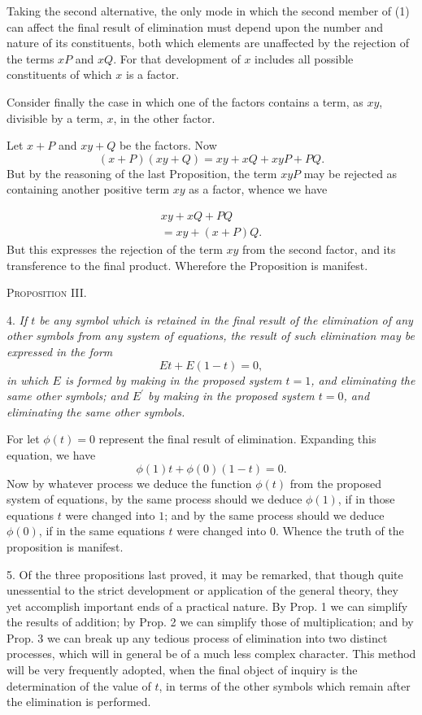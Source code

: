 \documentclass[oneside]{book}
\begin{document}
Taking the second alternative, the only mode in which the
second member of (1) can affect the final result of elimination
must depend upon the number and nature of its constituents,
both which elements are unaffected by the rejection of the terms
$xP$ and $xQ$. For that development of $x$ includes all possible constituents
of which $x$ is a factor.

Consider finally the case in which one of the factors contains
a term, as $xy$, divisible by a term, $x$, in the other factor.

Let $x+P$ and $xy+Q$ be the factors. Now
\[
(x+P)(xy+Q) = xy+xQ+xyP+PQ.
\]
But by the reasoning of the last Proposition, the term $xyP$ may be
rejected as containing another positive term $xy$ as a factor, whence
we have

\begin{eqnarray*}
xy + xQ + PQ\\
= xy + (x + P) Q.
\end{eqnarray*}
But this expresses the rejection of the term $xy$ from the second
factor, and its transference to the final product. Wherefore the
Proposition is manifest.

\begin{center}
\textsc{Proposition III.}
\end{center}

4. \textit{If $t$ be any symbol which is retained in the final result of the
elimination of any other symbols from any system of equations, the result
of such elimination may be expressed in the form
\[
Et + E \left(1-t\right)=0,
\]
in which $E$ is formed by making in the proposed system $t = 1$, and eliminating
the same other symbols; and $E^{\prime}$ by making in the proposed
system $t = 0$, and eliminating the same other symbols.}

For let $\phi\left(t\right) = 0$ represent the final result of elimination.
Expanding this equation, we have
\[
\phi\left(1\right)t + \phi\left(0\right)\left(1-t\right)=0.
\]
Now by whatever process we deduce the function $\phi\left(t\right)$ from the
proposed system of equations, by the same process should we deduce
$\phi\left(1\right)$, if in those equations $t$ were changed into $1$; and by
the same process should we deduce $\phi\left(0\right)$, if in the same equations
$t$ were changed into $0$. Whence the truth of the proposition is
manifest.

5. Of the three propositions last proved, it may be remarked,
that though quite unessential to the strict development or application
of the general theory, they yet accomplish important ends
of a practical nature. By Prop. 1 we can simplify the results
of addition; by Prop. 2 we can simplify those of multiplication;
and by Prop. 3 we can break up any tedious process of elimination
into two distinct processes, which will in general be of a
much less complex character. This method will be very frequently
adopted, when the final object of inquiry is the determination
of the value of $t$, in terms of the other symbols which remain
after the elimination is performed.
\end{document}
